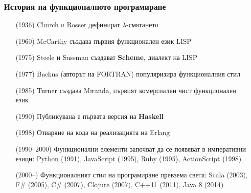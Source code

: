 \documentclass{beamer}
\begin{document}
\begin{frame}
  \frametitle{История на функционалното програмиране}

  \setlength{\leftmargini}{11ex}
  \begin{itemize}[<+->]
  \item[(1936)] Church и Rosser дефинират $\lambda$-смятането
  \item[(1960)] McCarthy създава първия функционален език LISP
  \item[(1975)] Steele и Sussman създават \textbf{Scheme}, диалект на LISP
  \item[(1977)] Backus (авторът на FORTRAN) популяризира функционалния стил
  \item[(1985)] Turner създава Miranda, първият комерсиален чист функционален език
  \item[(1990)] Публикувана е първата версия на \textbf{Haskell}
  \item[(1998)] Отваряне на кода на реализацията на Erlang  
  \item[(1990--2000)] Функционални елементи започват да се появяват в императивни езици: Python (1991), JavaScript (1995), Ruby (1995), ActionScript (1998)
  \item[(2000--)] Функционалният стил на програмиране превзема света: Scala (2003), F\# (2005), C\# (2007), Clojure (2007), C++11 (2011), Java 8 (2014)
  \end{itemize}
\end{frame}
\end{document}
